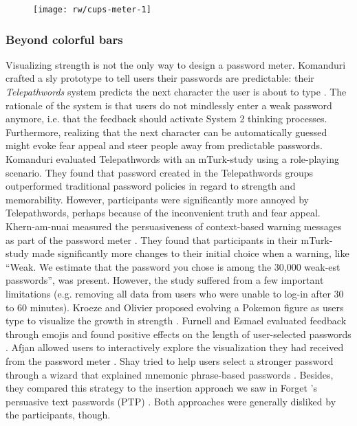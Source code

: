 	\cite{Proctor2002ImprovingAuthenticationProactivePasswordRestrictions}
	
	\begin{figure}
		\texttt{[image: rw/cups-meter-1]}
		\caption{\label{fig:rw:cups-meter}}
	\end{figure}
	
	\subsubsection{Beyond colorful bars}
	Visualizing strength is not the only way to design a password meter. Komanduri \etal crafted a sly prototype to tell users their passwords are predictable: their \textit{Telepathwords} system predicts the next character the user is about to type \cite{Komanduri2014Telepathwords}. The rationale of the system is that users do not mindlessly enter a weak password anymore, i.e. that the feedback should activate System 2 thinking processes. Furthermore, realizing that the next character can be automatically guessed might evoke fear appeal and steer people away from predictable passwords. Komanduri \etal evaluated Telepathwords with an \gls{mTurk}-study using a role-playing scenario. They found that password created in the Telepathwords groups outperformed traditional password policies in regard to strength and memorability. However, participants were significantly more annoyed by Telepathwords, perhaps because of the inconvenient truth and fear appeal. Khern-am-nuai \etal measured the persuasiveness of context-based warning messages as part of the password meter \cite{Khern-am-nuai2017ContextBasedMeter}. They found that participants in their \gls{mTurk}-study made significantly more changes to their initial choice when a warning, like ``Weak. We estimate
	that the password you chose is among the 30,000 weak-est passwords'', was present. However, the study suffered from a few important limitations (e.g. removing all data from users who were unable to log-in after 30 to 60 minutes). Kroeze and Olivier proposed evolving a Pokemon figure as users type to visualize the growth in strength  \cite{Kroeze2012GamifyingAuthentication}. Furnell and Esmael evaluated feedback through emojis and found positive effects on the length of user-selected passwords \cite{Furnell2017GuidanceCompliance}. Afjan \etal allowed users to interactively explore the visualization they had received from the password meter \cite{Aljaffan2017PasswordSecurityVisualizer}. Shay \etal tried to help users select a stronger password through a wizard that explained mnemonic phrase-based passwords \cite{Shay2015SpoonfulOfSugar}. Besides, they compared this strategy to the insertion approach we saw in Forget \etal's persuasive text passwords (PTP) \cite{Forget2008ImprovingPasswordsThroughPersuasion}. Both approaches were generally disliked by the participants, though. 
	
